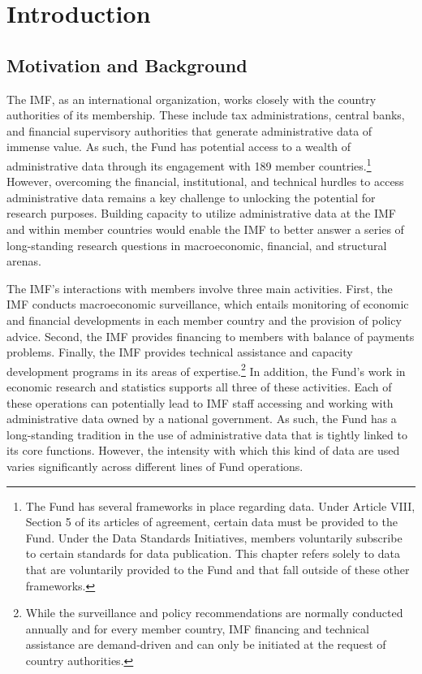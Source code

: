 \hypertarget{introduction-9}{%
\section{Introduction}\label{introduction-9}}

\hypertarget{motivation-and-background-7}{%
\subsection{Motivation and Background}\label{motivation-and-background-7}}

The IMF, as an international organization, works closely with the country authorities of its membership. These include tax administrations, central banks, and financial supervisory authorities that generate administrative data of immense value. As such, the Fund has potential access to a wealth of administrative data through its engagement with 189 member countries.\footnote{The Fund has several frameworks in place regarding data. Under Article VIII, Section 5 of its articles of agreement, certain data must be provided to the Fund. Under the Data Standards Initiatives, members voluntarily subscribe to certain standards for data publication. This chapter refers solely to data that are voluntarily provided to the Fund and that fall outside of these other frameworks.} However, overcoming the financial, institutional, and technical hurdles to access administrative data remains a key challenge to unlocking the potential for research purposes. Building capacity to utilize administrative data at the IMF and within member countries would enable the IMF to better answer a series of long-standing research questions in macroeconomic, financial, and structural arenas.

The IMF's interactions with members involve three main activities. First, the IMF conducts macroeconomic surveillance, which entails monitoring of economic and financial developments in each member country and the provision of policy advice. Second, the IMF provides financing to members with balance of payments problems. Finally, the IMF provides technical assistance and capacity development programs in its areas of expertise.\footnote{While the surveillance and policy recommendations are normally conducted annually and for every member country, IMF financing and technical assistance are demand-driven and can only be initiated at the request of country authorities.} In addition, the Fund's work in economic research and statistics supports all three of these activities. Each of these operations can potentially lead to IMF staff accessing and working with administrative data owned by a national government. As such, the Fund has a long-standing tradition in the use of administrative data that is tightly linked to its core functions. However, the intensity with which this kind of data are used varies significantly across different lines of Fund operations.

